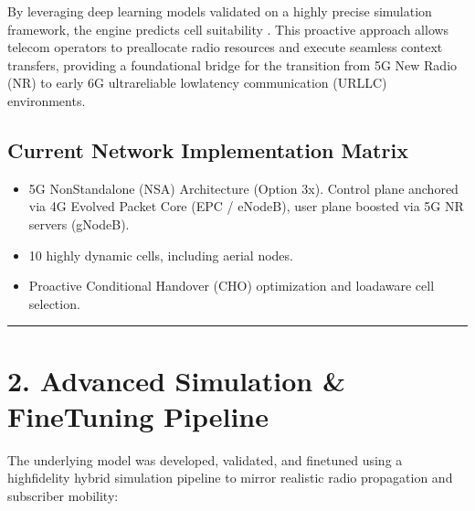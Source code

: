 \documentclass[letterpaper,10pt,english]{sphinxmanual}
\begin{document}
\sphinxAtStartPar
By leveraging deep learning models validated on a highly precise simulation framework, the engine predicts cell suitability . This proactive approach allows telecom operators to pre\sphinxhyphen{}allocate radio resources and execute seamless context transfers, providing a foundational bridge for the transition from 5G New Radio (NR) to early 6G ultra\sphinxhyphen{}reliable low\sphinxhyphen{}latency communication (URLLC) environments.


\subsection{Current Network Implementation Matrix}
\label{\detokenize{deployement:current-network-implementation-matrix}}\begin{itemize}
\item {} 
\sphinxAtStartPar
{} 5G Non\sphinxhyphen{}Standalone (NSA) Architecture (Option 3x). Control plane anchored via 4G Evolved Packet Core (EPC / eNodeB), user plane boosted via 5G NR servers (gNodeB).

\item {} 
\sphinxAtStartPar
{} 10 highly dynamic cells, including aerial nodes.

\item {} 
\sphinxAtStartPar
{} Proactive Conditional Handover (CHO) optimization and load\sphinxhyphen{}aware cell selection.

\end{itemize}


\bigskip\hrule\bigskip



\section{2. Advanced Simulation \& Fine\sphinxhyphen{}Tuning Pipeline}
\label{\detokenize{deployement:advanced-simulation-fine-tuning-pipeline}}
\sphinxAtStartPar
The underlying model was developed, validated, and fine\sphinxhyphen{}tuned using a high\sphinxhyphen{}fidelity hybrid simulation pipeline to mirror realistic radio propagation and subscriber mobility:
\end{document}
